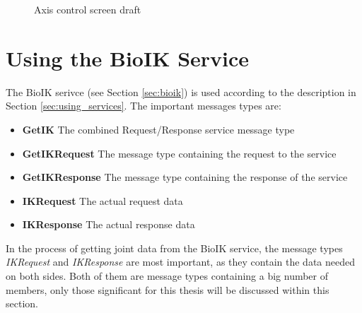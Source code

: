 \begin{figure}
	\caption{\label{fig:axiscontrol:screen}Axis control screen draft}
\end{figure}

\section{Using the BioIK Service}
\label{sec:robotarm:ctrl}

The BioIK serivce (see Section \ref{sec:bioik}) is used according to the description in Section \ref{sec:using_services}. The important messages types are:
\begin{itemize}
	\item \textbf{GetIK} The combined Request/Response service message type
	\item \textbf{GetIKRequest} The message type containing the request to the service
	\item \textbf{GetIKResponse} The message type containing the response of the service
	\item \textbf{IKRequest} The actual request data
	\item \textbf{IKResponse} The actual response data
\end{itemize}

In the process of getting joint data from the BioIK service, the message types \textit{IKRequest} and \textit{IKResponse} are most important, as they contain the data needed on both sides. Both of them are message types containing a big number of members, only those significant for this thesis will be discussed within this section.

